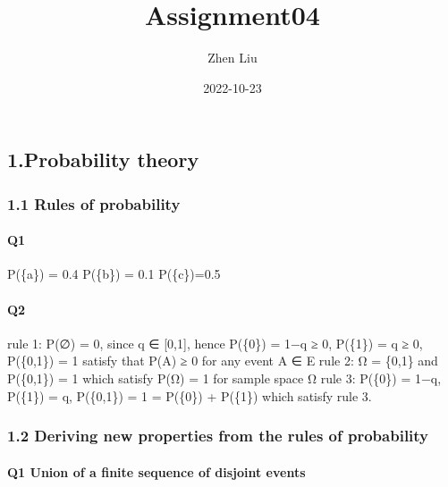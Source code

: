 \documentclass[
]{article}
\title{Assignment04}
\author{Zhen Liu}
\date{2022-10-23}
\begin{document}
\maketitle

\hypertarget{probability-theory}{%
\subsection{1.Probability theory}\label{probability-theory}}

\hypertarget{rules-of-probability}{%
\subsubsection{1.1 Rules of probability}\label{rules-of-probability}}

\hypertarget{q1}{%
\paragraph{Q1}\label{q1}}

P(\{a\}) = 0.4 P(\{b\}) = 0.1 P(\{c\})=0.5

\hypertarget{q2}{%
\paragraph{Q2}\label{q2}}

rule 1: P(∅) = 0, since q ∈ {[}0,1{]}, hence P(\{0\}) = 1−q ≥ 0,
P(\{1\}) = q ≥ 0, P(\{0,1\}) = 1 satisfy that P(A) ≥ 0 for any event A ∈
E rule 2: Ω = \{0,1\} and P(\{0,1\}) = 1 which satisfy P(Ω) = 1 for
sample space Ω rule 3: P(\{0\}) = 1−q, P(\{1\}) = q, P(\{0,1\}) = 1 =
P(\{0\}) + P(\{1\}) which satisfy rule 3.

\hypertarget{deriving-new-properties-from-the-rules-of-probability}{%
\subsubsection{1.2 Deriving new properties from the rules of
probability}\label{deriving-new-properties-from-the-rules-of-probability}}

\hypertarget{q1-union-of-a-finite-sequence-of-disjoint-events}{%
\paragraph{Q1 Union of a finite sequence of disjoint
events}\label{q1-union-of-a-finite-sequence-of-disjoint-events}}
\end{document}
